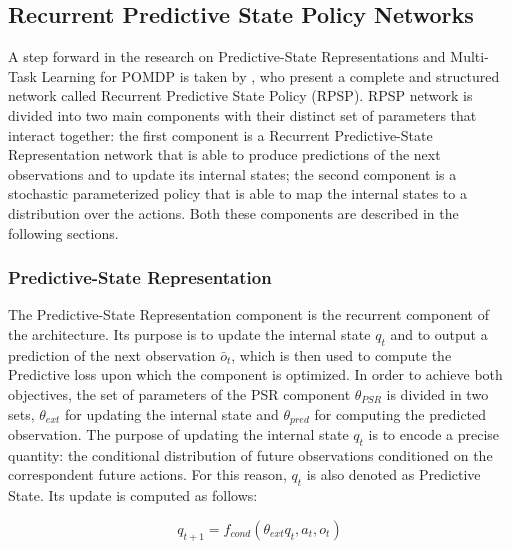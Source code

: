         \subsection{Recurrent Predictive State Policy Networks}
        \label{subs:rpsp}
            A step forward in the research on Predictive-State Representations and Multi-Task Learning for POMDP is taken by , who present a complete and structured network called Recurrent Predictive State Policy (RPSP). \newline
            RPSP network is divided into two main components with their distinct set of parameters that interact together: the first component is a Recurrent Predictive-State Representation network that is able to produce predictions of the next observations and to update its internal states; the second component is a stochastic parameterized policy that is able to map the internal states to a distribution over the actions. Both these components are described in the following sections.
            
            \subsubsection{Predictive-State Representation}
                The Predictive-State Representation component is the recurrent component of the architecture. Its purpose is to update the internal state $q_t$ and to output a prediction of the next observation $\bar{o}_t$, which is then used to compute the Predictive loss upon which the component is optimized. In order to achieve both objectives, the set of parameters of the PSR component $\theta_{PSR}$ is divided in two sets, $\theta_{ext}$ for updating the internal state and $\theta_{pred}$ for computing the predicted observation. \newline
                The purpose of updating the internal state $q_t$ is to encode a precise quantity: the conditional distribution of future observations conditioned on the correspondent future actions. For this reason, $q_t$ is also denoted as Predictive State. Its update is computed as follows:
                
                \[  q_{t+1} = f_{cond}(\theta_{ext} q_t, a_t, o_t) \]
                
